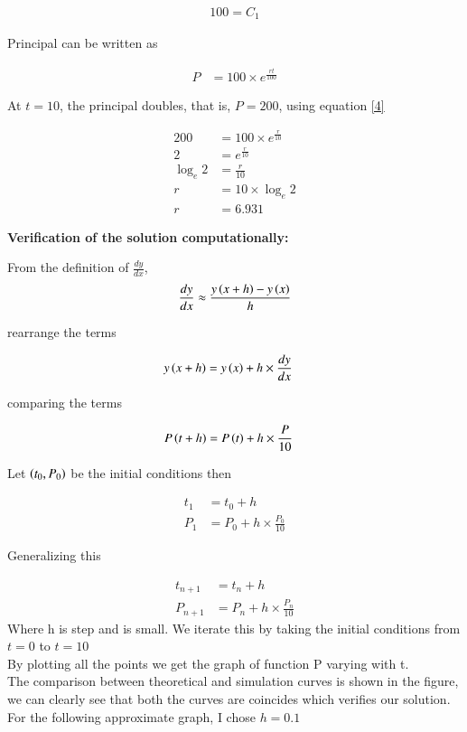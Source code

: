 \documentclass[journal]{IEEEtran}
\numberwithin{equation}{enumi}
\numberwithin{figure}{enumi}
\begin{document}
\begin{align}
    100 = C_1
\end{align}

Principal can be written as

\begin{align}
    P &= 100 \times e^{\frac{rt}{100}} \label{4}
\end{align}

At $t = 10$, the principal doubles, that is, $P = 200$, using equation \eqref{4}

\begin{align}
    200 &= 100 \times e^{\frac{r}{10}}\\
    2 &= e^{\frac{r}{10}}\\
    \log_e{2} &= \frac{r}{10}\\
    r &= 10 \times \log_e{2}\\
    r &= 6.931
\end{align}

\textbf{Verification of the solution computationally:}

From the definition of $\frac{dy}{dx}$,
\begin{align}
    \frac{dy}{dx} \approx \frac{y\left(x + h\right) - y\left(x\right)}{h}
\end{align}

rearrange the terms 

\begin{align}
    y\left(x + h\right) &= y\left(x\right) + h \times \frac{dy}{dx}
\end{align}

comparing the terms

\begin{align}
    P\left(t + h\right) &= P\left(t\right) + h \times \frac{P}{10}
\end{align}

Let $\left(t_0, P_0\right)$ be the initial conditions then 

\begin{align}
    t_1 &= t_0 + h\\
    P_1 &= P_0 + h \times \frac{P_0}{10}
\end{align}

Generalizing this 

\begin{align}
    t_{n+1} &= t_{n}+h \\
    P_{n+1} &= P_{n}+h \times \frac{P_n}{10}
\end{align}
Where h is step and is small.
We iterate this by taking the initial conditions from $t = 0$ to $t = 10$\\
By plotting all the points  we get the graph of function P varying with t.\\
The comparison between theoretical and simulation curves is shown in the figure, we can clearly see that both the curves are coincides which verifies our solution.\\
For the following approximate graph, I chose $h = 0.1$
\end{document}
